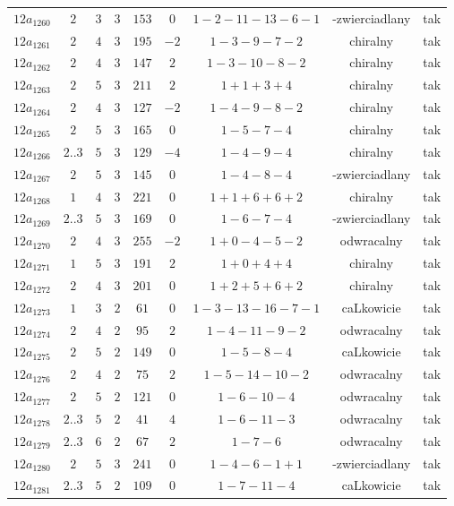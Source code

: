 \begin{longtable}{ccccccccc}
$12a_{1260}$ & $2$ & $3$ & $3$ & $153$ & $0$ & $1-2-11-13-6-1$ & -zwierciadlany & tak \\
$12a_{1261}$ & $2$ & $4$ & $3$ & $195$ & $-2$ & $1-3-9-7-2$ & chiralny & tak \\
$12a_{1262}$ & $2$ & $4$ & $3$ & $147$ & $2$ & $1-3-10-8-2$ & chiralny & tak \\
$12a_{1263}$ & $2$ & $5$ & $3$ & $211$ & $2$ & $1+1+3+4$ & chiralny & tak \\
$12a_{1264}$ & $2$ & $4$ & $3$ & $127$ & $-2$ & $1-4-9-8-2$ & chiralny & tak \\
$12a_{1265}$ & $2$ & $5$ & $3$ & $165$ & $0$ & $1-5-7-4$ & chiralny & tak \\
$12a_{1266}$ & $2..3$ & $5$ & $3$ & $129$ & $-4$ & $1-4-9-4$ & chiralny & tak \\
$12a_{1267}$ & $2$ & $5$ & $3$ & $145$ & $0$ & $1-4-8-4$ & -zwierciadlany & tak \\
$12a_{1268}$ & $1$ & $4$ & $3$ & $221$ & $0$ & $1+1+6+6+2$ & chiralny & tak \\
$12a_{1269}$ & $2..3$ & $5$ & $3$ & $169$ & $0$ & $1-6-7-4$ & -zwierciadlany & tak \\
$12a_{1270}$ & $2$ & $4$ & $3$ & $255$ & $-2$ & $1+0-4-5-2$ & odwracalny & tak \\
$12a_{1271}$ & $1$ & $5$ & $3$ & $191$ & $2$ & $1+0+4+4$ & chiralny & tak \\
$12a_{1272}$ & $2$ & $4$ & $3$ & $201$ & $0$ & $1+2+5+6+2$ & chiralny & tak \\
$12a_{1273}$ & $1$ & $3$ & $2$ & $61$ & $0$ & $1-3-13-16-7-1$ & caLkowicie & tak \\
$12a_{1274}$ & $2$ & $4$ & $2$ & $95$ & $2$ & $1-4-11-9-2$ & odwracalny & tak \\
$12a_{1275}$ & $2$ & $5$ & $2$ & $149$ & $0$ & $1-5-8-4$ & caLkowicie & tak \\
$12a_{1276}$ & $2$ & $4$ & $2$ & $75$ & $2$ & $1-5-14-10-2$ & odwracalny & tak \\
$12a_{1277}$ & $2$ & $5$ & $2$ & $121$ & $0$ & $1-6-10-4$ & odwracalny & tak \\
$12a_{1278}$ & $2..3$ & $5$ & $2$ & $41$ & $4$ & $1-6-11-3$ & odwracalny & tak \\
$12a_{1279}$ & $2..3$ & $6$ & $2$ & $67$ & $2$ & $1-7-6$ & odwracalny & tak \\
$12a_{1280}$ & $2$ & $5$ & $3$ & $241$ & $0$ & $1-4-6-1+1$ & -zwierciadlany & tak \\
$12a_{1281}$ & $2..3$ & $5$ & $2$ & $109$ & $0$ & $1-7-11-4$ & caLkowicie & tak \\

\end{longtable}
